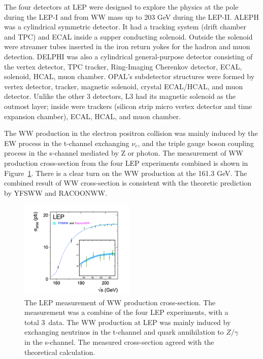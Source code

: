 The four detectors at LEP were designed to explore the physics at the \PZ pole during the LEP-I and from WW mass up to 203 GeV during the LEP-II. ALEPH was a cylindrical symmetric detector. It had a tracking system  (drift chamber and TPC) and ECAL inside a supper conducting solenoid. Outside the solenoid were streamer tubes inserted in the iron return yokes for the hadron and muon detection. DELPHI was also a cylindrical general-purpose detector consisting of the vertex detector, TPC tracker, Ring-Imaging Cherenkov detector, ECAL, solenoid, HCAL, muon chamber. OPAL's subdetector structures were formed by vertex detector, tracker, magnetic solenoid, crystal ECAL/HCAL, and muon detector. Unlike the other 3 detectors, L3 had its magnetic solenoid as the outmost layer; inside were trackers (silicon strip micro vertex detector and time expansion chamber), ECAL, HCAL, and muon chamber. 

The WW production in the electron positron collision was mainly induced by the EW process in the t-channel exchanging $\nu_e$, and the triple gauge boson coupling process in the s-channel mediated by Z or photon. The measurement of WW production cross-section from the four LEP experiments combined is shown in Figure~\ref{fig:relatedWorks:lu:W:lepWWxs}. There is a clear turn on the WW production at the 161.3 GeV. The combined result of WW cross-section is consistent with the theoretic prediction by YFSWW and RACOONWW.

\begin{figure}[ht]
    \centering
    \includegraphics[width=0.49\textwidth]{chapters/RelatedWorks/sectionLU/figures/lep_ww.png}
    \caption{The LEP measurement of WW production cross-section. The measurement was a combine of the four LEP experiments, with a total 3~\fbinv  data. The WW production at LEP was mainly induced by exchanging neutrinos in the t-channel and quark annihilation to $Z/\gamma$  in the s-channel. The measured cross-section agreed with the theoretical calculation.}
    \label{fig:relatedWorks:lu:W:lepWWxs}
\end{figure}

